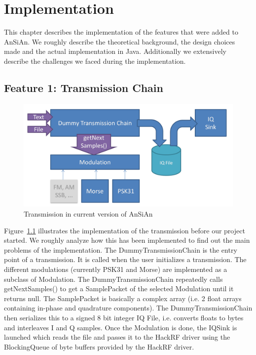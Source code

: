 
\chapter{Implementation}

This chapter describes the implementation of the features that were added to \ac{AnSiAn}. We roughly describe the theoretical background, the design choices made and the actual implementation in Java. Additionally we extensively describe the challenges we faced during the implementation. 

\section{Feature 1: Transmission Chain}

\label{sec:impl:feature1}

\begin{figure}
	\centering
	\includegraphics[width=1\linewidth]{gfx/TX_chain_step2.png}
	\caption{Transmission in current version of AnSiAn \cite{Mantz2016}}
	\label{fig:tx_chain_old2}
\end{figure}


Figure~\ref{fig:tx_chain_old2} illustrates the implementation of the transmission before our project started. We roughly analyze how this has been implemented to find out the main problems of the implementation. The DummyTransmissionChain is the entry point of a transmission. It is called when the user initializes a transmission. The different modulations (currently PSK31 and Morse) are implemented as a subclass of Modulation. The DummyTransmissionChain repeatedly calls getNextSamples() to get a SamplePacket of the selected Modulation until it returns null. The SamplePacket is basically a complex array (i.e. 2 float arrays containing in-phase and quadrature components). The DummyTransmissionChain then serializes this to a signed 8 bit integer IQ File, i.e. converts floats to bytes and interleaves I and Q samples. Once the Modulation is done, the IQSink is launched which reads the file and passes it to the HackRF driver using the BlockingQueue of byte buffers provided by the HackRF driver. 

